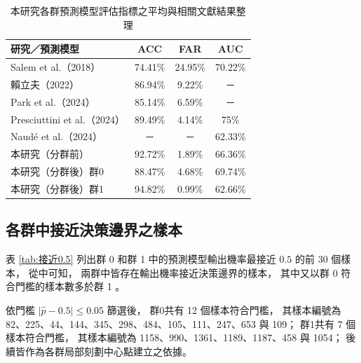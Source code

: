 \documentclass[12pt,a4paper,oneside]{book}
\begin{document}
	\begin{table}[H]
		\centering
		\caption{本研究各群預測模型評估指標之平均與相關文獻結果整理}
		\vspace{0.25cm}
		\label{tab:五折交叉驗證重抽預測模型評估}
		\begin{tabular}{|l|c|c|c|}
			\hline
			研究／預測模型              & ACC     & FAR     & AUC     \\
			\hline
			Salem et al.（2018）       & 74.41\% & 24.95\% & 70.22\% \\
			\hline
			賴立夫（2022）              & 86.94\% & 9.22\%  & －      \\
			\hline
			Park et al.（2024）        & 85.14\% & 6.59\%  & －      \\
			\hline
			Presciuttini et al.（2024）& 89.49\% & 4.14\%  & 75\%    \\
			\hline
			Naudé et al.（2024）       & －      & －      & 62.33\% \\     
			\hline
			本研究（分群前）            & 92.72\% & 1.89\%  & 66.36\% \\
			\hline
			本研究（分群後）群0         & 88.47\% & 4.68\%  & 69.74\% \\
			\hline
			本研究（分群後）群1         & 94.82\% & 0.99\%  & 62.66\% \\
			\hline
		\end{tabular}
	\end{table}

	\subsection{各群中接近決策邊界之樣本}

	表 \ref{tab:接近0.5} 列出群 0 和群 1 中的預測模型輸出機率最接近 $0.5$ 的前 30 個樣本，
	從中可知，
	兩群中皆存在輸出機率接近決策邊界的樣本，
	其中又以群 0 符合門檻的樣本數多於群 1 。

	依門檻 $\lvert \hat{p}-0.5\rvert \leq 0.05$ 篩選後，
	群0共有 12 個樣本符合門檻，
	其樣本編號為
	82、225、44、144、345、298、484、105、111、247、653 與 109；
	群1共有 7 個樣本符合門檻，
	其樣本編號為
	1158、990、1361、1189、1187、458 與 1054；
	後續皆作為各群局部刻劃中心點建立之依據。
\end{document}
